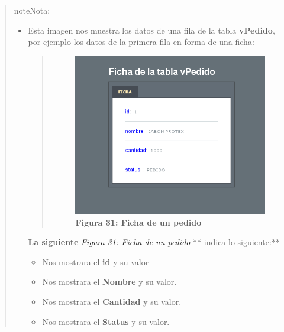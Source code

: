 \documentclass[letterpaper,11pt,spanish]{sphinxmanual}
\begin{document}
\begin{quote}
\begin{notice}{note}{Nota:}
\begin{itemize}
\begin{itemize}
\item {} 
Nos mostrara el \textbf{Nombre} y su valor.

\item {} 
Nos mostrara el \textbf{Status} y su valor.

\end{itemize}

\item {} 
Esta imagen nos muestra los datos de una fila de la tabla \textbf{vPedido}, por ejemplo los datos de la primera fila en forma de una ficha:
\begin{quote}
\begin{figure}[htbp]
\centering
\capstart

\includegraphics{fichavPedido.png}
\caption{\textbf{Figura 31: Ficha de un pedido}}\label{_templates/Contenido6/Parte5:figura48}\end{figure}
\end{quote}

\textbf{La siguiente} {\hyperref[_templates/Contenido6/Parte5:figura48]{\emph{Figura 31: Ficha de un pedido}}} ** indica lo siguiente:**
\begin{itemize}
\item {} 
Nos mostrara el \textbf{id} y su valor

\item {} 
Nos mostrara el \textbf{Nombre} y su valor.

\item {} 
Nos mostrara el \textbf{Cantidad} y su valor.

\item {} 
Nos mostrara el \textbf{Status} y su valor.

\end{itemize}

\end{itemize}
\end{notice}
\end{quote}
\end{document}
